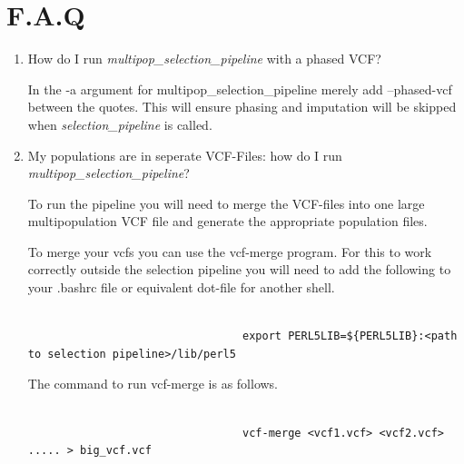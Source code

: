 \documentclass[a4paper,10pt]{article}
\begin{document}
                                 \section{F.A.Q}
                                 \begin{enumerate}



                                 \item How do I run \emph{multipop\_selection\_pipeline} with a phased VCF?

                                 In the -a argument for multipop\_selection\_pipeline merely add --phased-vcf
                                 between the quotes. This will ensure phasing and imputation will be
                                 skipped when \emph{selection\_pipeline} is called.


                                 \item My populations are in seperate VCF-Files: how do I run \emph{multipop\_selection\_pipeline}?

                                 To run the pipeline you will need to merge the VCF-files into one
                                 large multipopulation VCF file and generate the appropriate population
                                 files. 

                                 To merge your vcfs you can use the vcf-merge program. For this to work
                                 correctly outside the selection pipeline you will need to add the
                                 following to your .bashrc file or equivalent dot-file for another
                                 shell.\\

                                 \begin{verbatim}

                                 export PERL5LIB=${PERL5LIB}:<path to selection pipeline>/lib/perl5

                                 \end{verbatim}

                                 The command to run vcf-merge is as follows.

                                 \begin{verbatim}

                                 vcf-merge <vcf1.vcf> <vcf2.vcf> ..... > big_vcf.vcf


\end{verbatim}
\end{enumerate}
\end{document}
